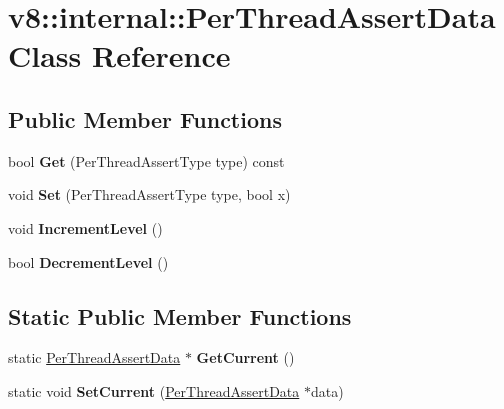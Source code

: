 \hypertarget{classv8_1_1internal_1_1_per_thread_assert_data}{}\section{v8\+:\+:internal\+:\+:Per\+Thread\+Assert\+Data Class Reference}
\label{classv8_1_1internal_1_1_per_thread_assert_data}
\subsection*{Public Member Functions}
\begin{DoxyCompactItemize}
\item 
bool {\bfseries Get} (Per\+Thread\+Assert\+Type type) const \hypertarget{classv8_1_1internal_1_1_per_thread_assert_data_afe784719c70a5836fe400f6d842b81c1}{}\label{classv8_1_1internal_1_1_per_thread_assert_data_afe784719c70a5836fe400f6d842b81c1}

\item 
void {\bfseries Set} (Per\+Thread\+Assert\+Type type, bool x)\hypertarget{classv8_1_1internal_1_1_per_thread_assert_data_ac8832ba0e67fd3dba9c76251d56e808a}{}\label{classv8_1_1internal_1_1_per_thread_assert_data_ac8832ba0e67fd3dba9c76251d56e808a}

\item 
void {\bfseries Increment\+Level} ()\hypertarget{classv8_1_1internal_1_1_per_thread_assert_data_a5d75f7c4553a5e46a03ff159439d33cf}{}\label{classv8_1_1internal_1_1_per_thread_assert_data_a5d75f7c4553a5e46a03ff159439d33cf}

\item 
bool {\bfseries Decrement\+Level} ()\hypertarget{classv8_1_1internal_1_1_per_thread_assert_data_a84e645d60ac3091382890e23d5f06362}{}\label{classv8_1_1internal_1_1_per_thread_assert_data_a84e645d60ac3091382890e23d5f06362}

\end{DoxyCompactItemize}
\subsection*{Static Public Member Functions}
\begin{DoxyCompactItemize}
\item 
static \hyperlink{classv8_1_1internal_1_1_per_thread_assert_data}{Per\+Thread\+Assert\+Data} $\ast$ {\bfseries Get\+Current} ()\hypertarget{classv8_1_1internal_1_1_per_thread_assert_data_af3344279ed8a6ac370bf08bc05b46f8e}{}\label{classv8_1_1internal_1_1_per_thread_assert_data_af3344279ed8a6ac370bf08bc05b46f8e}

\item 
static void {\bfseries Set\+Current} (\hyperlink{classv8_1_1internal_1_1_per_thread_assert_data}{Per\+Thread\+Assert\+Data} $\ast$data)\hypertarget{classv8_1_1internal_1_1_per_thread_assert_data_ae456804fb82cbc7becfac05aaa3996b3}{}\label{classv8_1_1internal_1_1_per_thread_assert_data_ae456804fb82cbc7becfac05aaa3996b3}

\end{DoxyCompactItemize}
